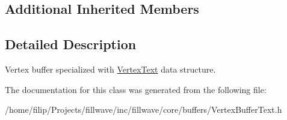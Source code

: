 \subsection*{Additional Inherited Members}


\subsection{Detailed Description}
Vertex buffer specialized with \hyperlink{structflw_1_1flc_1_1VertexText}{Vertex\+Text} data structure. 

The documentation for this class was generated from the following file\+:\begin{DoxyCompactItemize}
\item 
/home/filip/\+Projects/fillwave/inc/fillwave/core/buffers/Vertex\+Buffer\+Text.\+h\end{DoxyCompactItemize}
